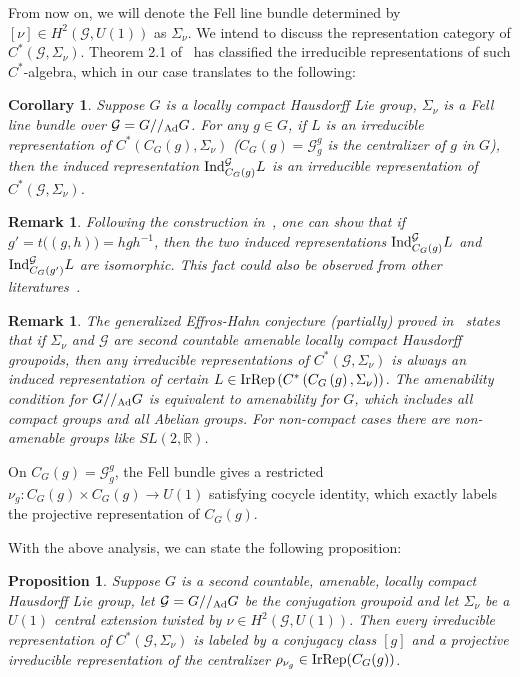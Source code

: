 \documentclass[a4paper,11pt]{article}
\newtheorem{corollary}[lemma]{Corollary}
\newtheorem{prop}[lemma]{Proposition}
\newtheorem{remark}[lemma]{Remark}
\def\bbR{\mathbb{R}}
\def\CG{\mathcal{G}}
\begin{document}
From now on, we will denote the Fell line bundle determined by $[\nu]\in H^2(\CG, U(1))$ as $\Sigma_\nu$. We intend to discuss the representation category of $C^*(\CG, \Sigma_\nu)$. Theorem 2.1 of~\cite{Ionescu:2013} has classified the irreducible representations of such $C^*$-algebra, which in our case translates to the following:
\begin{corollary}
    Suppose $G$ is a locally compact Hausdorff Lie group, $\Sigma_\nu$ is a Fell line bundle over $\CG = G//_{\rm Ad} G$. For any $g\in G$, if $L$ is an irreducible representation of $C^*(C_G(g) ,\Sigma_\nu)$ ($C_G(g) = \CG_g^g$ is the centralizer of $g$ in $G$), then the induced representation ${\rm Ind}_{C_G(g)}^{\CG}L$ is an irreducible representation of $C^*(\CG ,\Sigma_\nu)$.
\end{corollary}
\begin{remark}
    Following the construction in~\cite{Ionescu:2013}, one can show that if $g' = t\big( (g,h) \big) = hgh^{-1}$, then the two induced representations ${\rm Ind}_{C_G(g)}^{\CG}L$ and ${\rm Ind}_{C_G(g')}^{\CG}L$ are isomorphic. This fact could also be observed from other literatures~\cite{Buss:2026}.
\end{remark}
\begin{remark}
    The generalized Effros-Hahn conjecture (partially) proved in~\cite{Ionescu:2009} states that if $\Sigma_\nu$ and $\CG$ are second countable amenable locally compact Hausdorff groupoids, then any irreducible representations of $C^*(\CG ,\Sigma_\nu)$ is always an induced representation of certain $L\in {\rm IrRep}\left(C^*\left( C_G\left(g\right),\Sigma_\nu \right)\right)$. The amenability condition for $G//_{\rm Ad} G$ is equivalent to amenability for $G$, which includes all compact groups and all Abelian groups. For non-compact cases there are non-amenable groups like $SL(2,\bbR)$.
\end{remark}

On $C_G(g) = \CG_g^g$, the Fell bundle gives a restricted $\nu_g: C_G(g)\times C_G(g)\to U(1)$ satisfying cocycle identity, which exactly labels the projective representation of $C_G(g)$.

With the above analysis, we can state the following proposition:
\begin{prop}
    Suppose $G$ is a second countable, amenable, locally compact Hausdorff Lie group, let $\CG = G//_{\rm Ad}G$ be the conjugation groupoid and let $\Sigma_\nu$ be a $U(1)$ central extension twisted by $\nu\in H^2(\CG,U(1))$. Then every irreducible representation of $C^*(\CG,\Sigma_\nu)$ is labeled by a conjugacy class $[g]$ and a projective irreducible representation of the centralizer $\rho_{\nu_g} \in {\rm IrRep}(C_G(g))$.
\end{prop}
\end{document}
